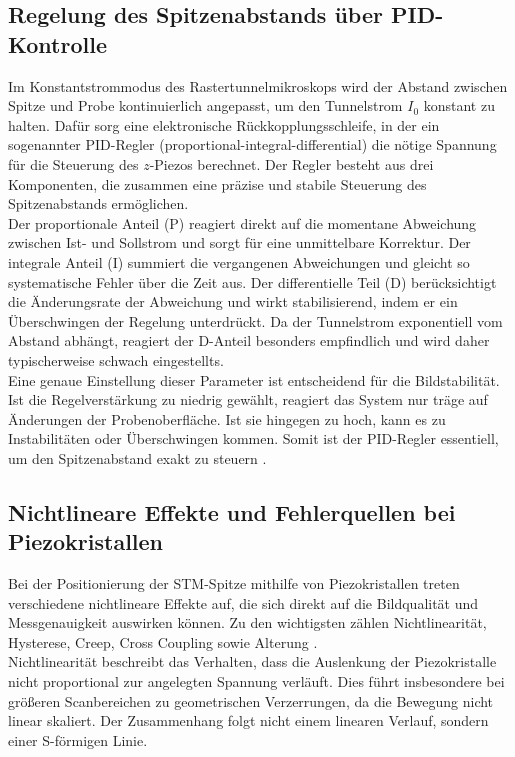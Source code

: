 \subsection{Regelung des Spitzenabstands über PID-Kontrolle}
\label{sec:PID-Regler}
Im Konstantstrommodus des Rastertunnelmikroskops wird der Abstand zwischen Spitze und Probe kontinuierlich angepasst, um den Tunnelstrom $I_0$ konstant zu halten. 
Dafür sorg eine elektronische Rückkopplungsschleife, in der ein sogenannter PID-Regler (proportional-integral-differential) die nötige Spannung für die Steuerung des $z$-Piezos berechnet.
Der Regler besteht aus drei Komponenten, die zusammen eine präzise und stabile Steuerung des Spitzenabstands ermöglichen.\\

Der proportionale Anteil (P) reagiert direkt auf die momentane Abweichung zwischen Ist- und Sollstrom und sorgt für eine unmittelbare Korrektur.
Der integrale Anteil (I) summiert die vergangenen Abweichungen und gleicht so systematische Fehler über die Zeit aus.
Der differentielle Teil (D) berücksichtigt die Änderungsrate der Abweichung und wirkt stabilisierend, indem er ein Überschwingen der Regelung unterdrückt. Da der Tunnelstrom exponentiell vom Abstand abhängt, reagiert der D-Anteil besonders empfindlich und wird daher typischerweise schwach eingestellts.\\ 

Eine genaue Einstellung dieser Parameter ist entscheidend für die Bildstabilität.
Ist die Regelverstärkung zu niedrig gewählt, reagiert das System nur träge auf Änderungen der Probenoberfläche. Ist sie hingegen zu hoch, kann es zu Instabilitäten oder Überschwingen kommen.
Somit ist der PID-Regler essentiell, um den Spitzenabstand exakt zu steuern \cite{naioManual}.

\subsection{Nichtlineare Effekte und Fehlerquellen bei Piezokristallen}
\label{sec:Fehlerquellen}
Bei der Positionierung der STM-Spitze mithilfe von Piezokristallen treten verschiedene nichtlineare Effekte auf, die sich direkt auf die Bildqualität und Messgenauigkeit auswirken können. Zu den wichtigsten zählen Nichtlinearität, Hysterese, Creep, Cross Coupling sowie Alterung \cite{GuidesScanningProbeMicroscope}.\\

Nichtlinearität beschreibt das Verhalten, dass die Auslenkung der Piezokristalle nicht proportional zur angelegten Spannung verläuft. Dies führt insbesondere bei größeren Scanbereichen zu geometrischen Verzerrungen, da die Bewegung nicht linear skaliert. Der Zusammenhang folgt nicht einem linearen Verlauf, sondern einer S-förmigen Linie.\\

